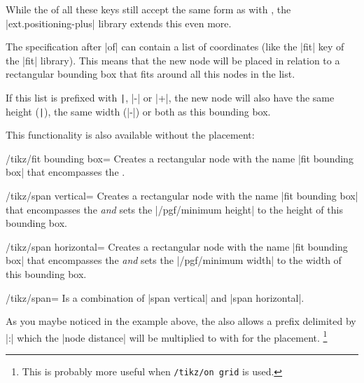 While the  of all these keys still accept the same form as with \tikzname,
the |ext.positioning-plus| library extends this even more.

The specification after |of| can contain a list of coordinates
(like the |fit| key of the |fit| library).
This means that the new node will be placed in relation to a rectangular bounding box
that fits around all this nodes in the list.

If this list is prefixed with \verb!|!, |-| or |+|,
the new node will also have the same height (\verb!|!),
the same width (|-|) or both as this bounding box.

\begin{codeexample}[preamble=\usetikzlibrary{ext.positioning-plus}]
\end{codeexample}

This functionality is also available without the placement:
\begin{stylekey}{/tikz/fit bounding box=}
  Creates a rectangular node with the name |fit bounding box| that encompasses
  the .
\end{stylekey}
\begin{stylekey}{/tikz/span vertical=}
  Creates a rectangular node with the name |fit bounding box| that encompasses
  the  \emph{and} sets the |/pgf/minimum height| to
  the height of this bounding box.
\end{stylekey}
\begin{stylekey}{/tikz/span horizontal=}
  Creates a rectangular node with the name |fit bounding box| that encompasses
  the  \emph{and} sets the |/pgf/minimum width| to
  the width of this bounding box.
\end{stylekey}
\begin{stylekey}{/tikz/span=}
  Is a combination of |span vertical| and |span horizontal|.
\end{stylekey}

As you maybe noticed in the example above, the  also allows a prefix
delimited by |:| which the |node distance| will be multiplied to with for the placement.%
\footnote{This is probably more useful when \texttt{/tikz/on grid} is used.}

\endinput